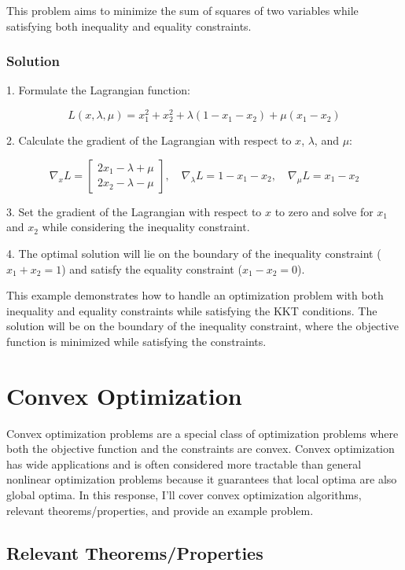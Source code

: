 \documentclass[a4paper]{article}
\begin{document}
This problem aims to minimize the sum of squares of two variables while satisfying both inequality and equality constraints.

\subsubsection{Solution}

1. Formulate the Lagrangian function:

\[
L(x, \lambda, \mu) = x_1^2 + x_2^2 + \lambda(1 - x_1 - x_2) + \mu(x_1 - x_2)
\]

2. Calculate the gradient of the Lagrangian with respect to \(x\), \(\lambda\), and \(\mu\):

\[
\nabla_x L = \begin{bmatrix} 2x_1 - \lambda + \mu \\ 2x_2 - \lambda - \mu \end{bmatrix}, \quad \nabla_\lambda L = 1 - x_1 - x_2, \quad \nabla_\mu L = x_1 - x_2
\]

3. Set the gradient of the Lagrangian with respect to \(x\) to zero and solve for \(x_1\) and \(x_2\) while considering the inequality constraint.

4. The optimal solution will lie on the boundary of the inequality constraint (\(x_1 + x_2 = 1\)) and satisfy the equality constraint (\(x_1 - x_2 = 0\)).

This example demonstrates how to handle an optimization problem with both inequality and equality constraints while satisfying the KKT conditions. The solution will be on the boundary of the inequality constraint, where the objective function is minimized while satisfying the constraints.

\section{Convex Optimization}

Convex optimization problems are a special class of optimization problems where both the objective function and the constraints are convex. Convex optimization has wide applications and is often considered more tractable than general nonlinear optimization problems because it guarantees that local optima are also global optima. In this response, I'll cover convex optimization algorithms, relevant theorems/properties, and provide an example problem.

\subsection{Relevant Theorems/Properties}
\end{document}

